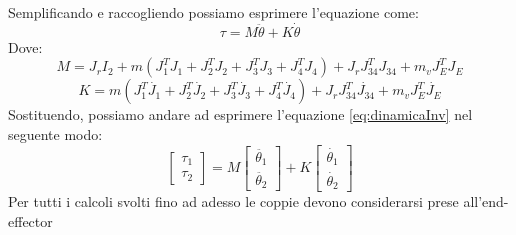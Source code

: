 Semplificando e raccogliendo possiamo esprimere l'equazione come:
\begin{equation}
    \tau = M \ddot{\theta} + K \dot{\theta}
    \label{eq:dinamicaInv}
\end{equation}
Dove:
\begin{equation}
    M = J_r I_2 + m(J_1^T J_1 + J_2^TJ_2+J_3^TJ_3+J_4^TJ_4)+J_rJ_{34}^TJ_{34} + m_vJ_E^TJ_E
    \label{eq:M}
\end{equation}
\begin{equation}
    K = m(J_1^T\dot{J_1}+J_2^T\dot{J_2}+J_3^T\dot{J_3}+J_4^T\dot{J_4})+J_rJ_{34}^T\dot{J_{34}}+m_vJ_E^T\dot{J_E}
    \label{eq:K}
\end{equation}
Sostituendo, possiamo andare ad esprimere l'equazione \ref{eq:dinamicaInv} nel seguente modo:
\begin{equation}
    \begin{bmatrix}
    \tau_1 \\ \tau_2
    \end{bmatrix} = 
    M\begin{bmatrix}
    \ddot{\theta_1} \\ \ddot{\theta_2}
    \end{bmatrix}
    + K \begin{bmatrix}
    \dot{\theta_1} \\ \dot{\theta_2}
    \end{bmatrix}
\end{equation}
Per tutti i calcoli svolti fino ad adesso le coppie devono considerarsi prese all'end-effector
